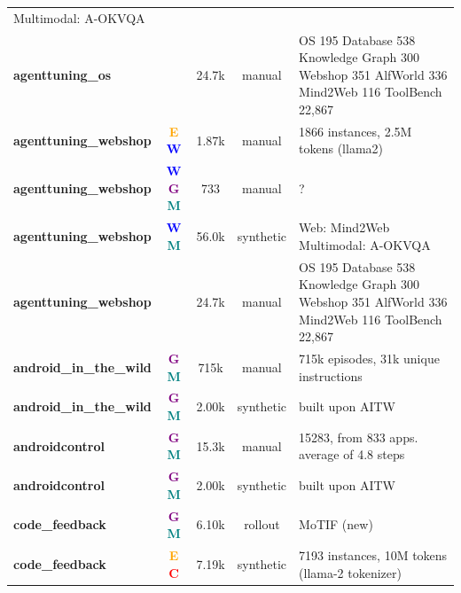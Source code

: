 \begin{table}[t]
\begin{tabular*}{\textwidth}{@{\extracolsep{\fill}}l c c c p{5cm}}
Multimodal: A-OKVQA \\
        \textbf{agenttuning\_os \cite{agent_flan_designing_2403_12881}} &  & 24.7k & manual & OS 195
Database 538
Knowledge Graph 300
Webshop 351
AlfWorld 336
Mind2Web 116
ToolBench 22,867 \\
        \textbf{agenttuning\_webshop \cite{agenttuning_enabling_2310_12823}} & \textcolor{orange}{\textbf{E}} \textcolor{blue}{\textbf{W}} & 1.87k & manual & 1866 instances, 2.5M tokens (llama2) \\
        \textbf{agenttuning\_webshop \cite{webvoyager_building__2401_13919}} & \textcolor{blue}{\textbf{W}} \textcolor{purple}{\textbf{G}} \textcolor{teal}{\textbf{M}} & 733 & manual & ? \\
        \textbf{agenttuning\_webshop \cite{agent_lumos_unified__2311_05657}} & \textcolor{blue}{\textbf{W}} \textcolor{teal}{\textbf{M}} & 56.0k & synthetic & Web: Mind2Web
Multimodal: A-OKVQA \\
        \textbf{agenttuning\_webshop \cite{agent_flan_designing_2403_12881}} &  & 24.7k & manual & OS 195
Database 538
Knowledge Graph 300
Webshop 351
AlfWorld 336
Mind2Web 116
ToolBench 22,867 \\
        \textbf{android\_in\_the\_wild \cite{android_in_the_wild__2307_10088}} & \textcolor{purple}{\textbf{G}} \textcolor{teal}{\textbf{M}} & 715k & manual & 715k episodes, 31k unique instructions \\
        \textbf{android\_in\_the\_wild \cite{android_in_the_zoo_c_2403_02713}} & \textcolor{purple}{\textbf{G}} \textcolor{teal}{\textbf{M}} & 2.00k & synthetic & built upon AITW \\
        \textbf{androidcontrol \cite{on_the_effects_of_da_2406_03679}} & \textcolor{purple}{\textbf{G}} \textcolor{teal}{\textbf{M}} & 15.3k & manual & 15283, from 833 apps. average of 4.8 steps \\
        \textbf{androidcontrol \cite{android_in_the_zoo_c_2403_02713}} & \textcolor{purple}{\textbf{G}} \textcolor{teal}{\textbf{M}} & 2.00k & synthetic & built upon AITW \\
        \textbf{code\_feedback \cite{mobile_app_tasks_wit_2104_08560}} & \textcolor{purple}{\textbf{G}} \textcolor{teal}{\textbf{M}} & 6.10k & rollout & MoTIF (new) \\
        \textbf{code\_feedback \cite{executable_code_acti_2402_01030}} & \textcolor{orange}{\textbf{E}} \textcolor{red}{\textbf{C}} & 7.19k & synthetic & 7193 instances, 10M tokens (llama-2 tokenizer) \\

\end{tabular*}
\end{table}
